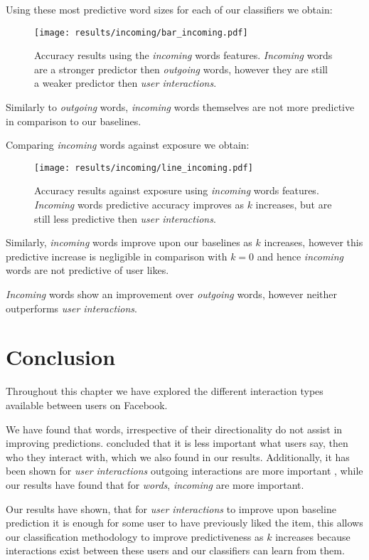 \clearpage

Using these most predictive word sizes for each of our classifiers we obtain:

\begin{figure}[h]
	\begin{center}
		\texttt{[image: results/incoming/bar\_incoming.pdf]}
		\caption{Accuracy results using the \emph{incoming} words features. \emph{Incoming} words are a 
				 stronger predictor then \emph{outgoing} words, however they are still a weaker predictor then \emph{user interactions}.}
	\end{center}
\end{figure}

Similarly to \emph{outgoing} words, \emph{incoming} words themselves are not more predictive in comparison to our baselines.

Comparing \emph{incoming} words against exposure we obtain:

\begin{figure}[h]
	\begin{center}
		\texttt{[image: results/incoming/line\_incoming.pdf]}
		\caption{Accuracy results against exposure using \emph{incoming} words features. 
				 \emph{Incoming} words predictive accuracy improves as $k$ increases, but are still less predictive then \emph{user interactions}.
		}
	\end{center}
\end{figure}

Similarly, \emph{incoming} words improve upon our baselines as $k$ increases, however this predictive increase is 
negligible in comparison with $k = 0$ and hence \emph{incoming} words are not predictive of user likes.

\emph{Incoming} words show an improvement over \emph{outgoing} words, however neither outperforms \emph{user interactions}.

\section{Conclusion}
\label{sec:conc}

Throughout this chapter we have explored the different interaction types available between users on Facebook. 

We have found that words, irrespective of their directionality do not assist in improving predictions. \cite{Anderson2012} concluded 
that it is less important what users say, then who they interact with, which we also found in our results. Additionally, it has been shown
for \emph{user interactions} outgoing interactions are more important \cite{www}, while our results have found that
for \emph{words}, \emph{incoming} are more important.

Our results have shown, that for \emph{user interactions} to improve upon baseline prediction it is enough for some user to 
have previously liked the item, this allows our classification methodology to improve predictiveness as $k$ increases because 
interactions exist between these users and our classifiers can learn from them.

